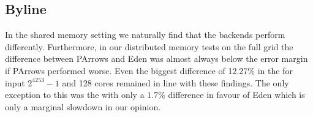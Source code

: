 \subsection{Byline}

In the shared memory setting we naturally find that the backends perform differently. Furthermore, in our distributed memory tests on the full grid the difference between PArrows and Eden was almost always below the error margin if PArrows performed worse. Even the biggest difference of 12.27\% in the \jacobitest for input $2^{4253}-1$ and 128 cores remained in line with these findings. The only exception to this was the \torustest  with only a $1.7\%$ difference in favour of Eden which is only a marginal slowdown in our opinion.
